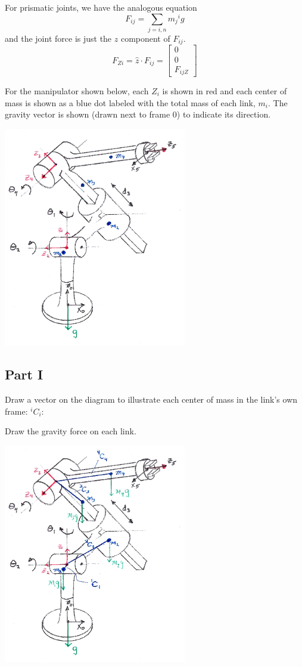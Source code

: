 For prismatic joints,  we have the analogous equation
\[
F_{ij} = \sum_{j=i,n} m_j {^ig}
\]
and the joint force is just the $z$ component of $F_{ij}$.
\[
F_{Zi} =  \hat{z}\cdot F_{ij} = \begin{bmatrix}0\\0\\ F_{ijZ}\end{bmatrix}
\]


\begin{Example}
For the manipulator shown below, each $Z_i$ is shown in red and each center of mass is shown as a blue dot labeled with the total mass of each link, $m_i$.    The gravity vector is shown (drawn next to frame 0) to indicate its direction.


\includegraphics[width=80mm]{figs06/00695B.eps}

\subsection*{Part I}

Draw a vector on the diagram to illustrate each center of mass in the link's own frame:  $^iC_i$:

Draw the gravity force on each link.

\includegraphics[width=80mm]{figs06/00858.eps}


\end{Example}
